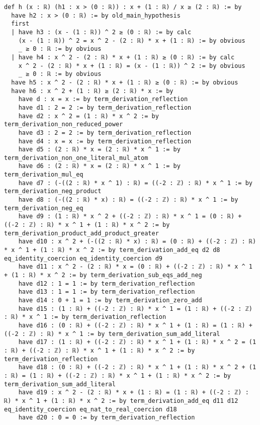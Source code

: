 \documentclass{article}
\begin{document}
\begin{tcolorbox}[colback=white!10, width=\linewidth]
\begin{lstlisting}[language=Lean4]
def h (x : ℝ) (h1 : x > (0 : ℝ)) : x + (1 : ℝ) / x ≥ (2 : ℝ) := by
  have h2 : x > (0 : ℝ) := by old_main_hypothesis
  first
  | have h3 : (x - (1 : ℝ)) ^ 2 ≥ (0 : ℝ) := by calc
    (x - (1 : ℝ)) ^ 2 = x ^ 2 - (2 : ℝ) * x + (1 : ℝ) := by obvious
    _ ≥ 0 : ℝ := by obvious
  | have h4 : x ^ 2 - (2 : ℝ) * x + (1 : ℝ) ≥ (0 : ℝ) := by calc
    x ^ 2 - (2 : ℝ) * x + (1 : ℝ) = (x - (1 : ℝ)) ^ 2 := by obvious
    _ ≥ 0 : ℝ := by obvious
  have h5 : x ^ 2 - (2 : ℝ) * x + (1 : ℝ) ≥ (0 : ℝ) := by obvious
  have h6 : x ^ 2 + (1 : ℝ) ≥ (2 : ℝ) * x := by
    have d : x = x := by term_derivation_reflection
    have d1 : 2 = 2 := by term_derivation_reflection
    have d2 : x ^ 2 = (1 : ℝ) * x ^ 2 := by term_derivation_non_reduced_power
    have d3 : 2 = 2 := by term_derivation_reflection
    have d4 : x = x := by term_derivation_reflection
    have d5 : (2 : ℝ) * x = (2 : ℝ) * x ^ 1 := by term_derivation_non_one_literal_mul_atom
    have d6 : (2 : ℝ) * x = (2 : ℝ) * x ^ 1 := by term_derivation_mul_eq
    have d7 : (-((2 : ℝ) * x ^ 1) : ℝ) = ((-2 : ℤ) : ℝ) * x ^ 1 := by term_derivation_neg_product
    have d8 : (-((2 : ℝ) * x) : ℝ) = ((-2 : ℤ) : ℝ) * x ^ 1 := by term_derivation_neg_eq
    have d9 : (1 : ℝ) * x ^ 2 + ((-2 : ℤ) : ℝ) * x ^ 1 = (0 : ℝ) + ((-2 : ℤ) : ℝ) * x ^ 1 + (1 : ℝ) * x ^ 2 := by term_derivation_product_add_product_greater
    have d10 : x ^ 2 + (-((2 : ℝ) * x) : ℝ) = (0 : ℝ) + ((-2 : ℤ) : ℝ) * x ^ 1 + (1 : ℝ) * x ^ 2 := by term_derivation_add_eq d2 d8 eq_identity_coercion eq_identity_coercion d9
    have d11 : x ^ 2 - (2 : ℝ) * x = (0 : ℝ) + ((-2 : ℤ) : ℝ) * x ^ 1 + (1 : ℝ) * x ^ 2 := by term_derivation_sub_eqs_add_neg
    have d12 : 1 = 1 := by term_derivation_reflection
    have d13 : 1 = 1 := by term_derivation_reflection
    have d14 : 0 + 1 = 1 := by term_derivation_zero_add
    have d15 : (1 : ℝ) + ((-2 : ℤ) : ℝ) * x ^ 1 = (1 : ℝ) + ((-2 : ℤ) : ℝ) * x ^ 1 := by term_derivation_reflection
    have d16 : (0 : ℝ) + ((-2 : ℤ) : ℝ) * x ^ 1 + (1 : ℝ) = (1 : ℝ) + ((-2 : ℤ) : ℝ) * x ^ 1 := by term_derivation_sum_add_literal
    have d17 : (1 : ℝ) + ((-2 : ℤ) : ℝ) * x ^ 1 + (1 : ℝ) * x ^ 2 = (1 : ℝ) + ((-2 : ℤ) : ℝ) * x ^ 1 + (1 : ℝ) * x ^ 2 := by term_derivation_reflection
    have d18 : (0 : ℝ) + ((-2 : ℤ) : ℝ) * x ^ 1 + (1 : ℝ) * x ^ 2 + (1 : ℝ) = (1 : ℝ) + ((-2 : ℤ) : ℝ) * x ^ 1 + (1 : ℝ) * x ^ 2 := by term_derivation_sum_add_literal
    have d19 : x ^ 2 - (2 : ℝ) * x + (1 : ℝ) = (1 : ℝ) + ((-2 : ℤ) : ℝ) * x ^ 1 + (1 : ℝ) * x ^ 2 := by term_derivation_add_eq d11 d12 eq_identity_coercion eq_nat_to_real_coercion d18
    have d20 : 0 = 0 := by term_derivation_reflection

\end{lstlisting}
\end{tcolorbox}
\end{document}
